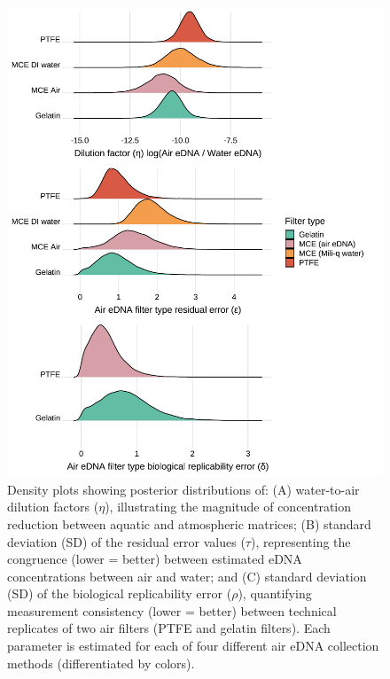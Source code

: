 \documentclass{article}
\begin{document}
\begin{figure}[tbhp] 
\centering
\includegraphics[width=15.5cm]{../../Plots/Supplementary Figure 2.pdf}  
\caption{Density plots showing posterior distributions of: (A) water-to-air dilution factors ($\eta$), illustrating the magnitude of concentration reduction between aquatic and atmospheric matrices; (B) standard deviation (SD) of the residual error values ($\tau$), representing the congruence (lower = better) between estimated eDNA concentrations between air and water; and (C) standard deviation (SD) of the biological replicability error ($\rho$), quantifying measurement consistency (lower = better) between 
technical replicates of two air filters (PTFE and gelatin filters). Each parameter is estimated for each of four different air eDNA collection methods (differentiated by colors).}
\label{fig:fig2}
\end{figure}

\end{document}
